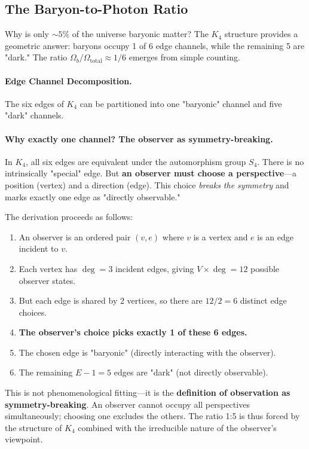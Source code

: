 \documentclass[11pt,a4paper]{book}
\begin{document}
\subsection{The Baryon-to-Photon Ratio}

Why is only $\sim 5\%$ of the universe baryonic matter? The $K_4$ structure provides a 
geometric answer: baryons occupy 1 of 6 edge channels, while the remaining 5 are "dark." 
The ratio $\Omega_b/\Omega_{\text{total}} \approx 1/6$ emerges from simple counting.

\paragraph{Edge Channel Decomposition.}
The six edges of $K_4$ can be partitioned into one "baryonic" channel and five "dark" 
channels. 

\paragraph{Why exactly one channel? The observer as symmetry-breaking.}

In $K_4$, all six edges are equivalent under the automorphism group $S_4$. There is no 
intrinsically "special" edge. But \textbf{an observer must choose a perspective}—a 
position (vertex) and a direction (edge). This choice \emph{breaks the symmetry} and 
marks exactly one edge as "directly observable."

The derivation proceeds as follows:
\begin{enumerate}
\item An observer is an ordered pair $(v, e)$ where $v$ is a vertex and $e$ is an edge 
      incident to $v$.
\item Each vertex has $\deg = 3$ incident edges, giving $V \times \deg = 12$ possible 
      observer states.
\item But each edge is shared by 2 vertices, so there are $12/2 = 6$ distinct edge choices.
\item \textbf{The observer's choice picks exactly 1 of these 6 edges.}
\item The chosen edge is "baryonic" (directly interacting with the observer).
\item The remaining $E - 1 = 5$ edges are "dark" (not directly observable).
\end{enumerate}

This is not phenomenological fitting—it is the \textbf{definition of observation as 
symmetry-breaking}. An observer cannot occupy all perspectives simultaneously; choosing 
one excludes the others. The ratio 1:5 is thus forced by the structure of $K_4$ combined 
with the irreducible nature of the observer's viewpoint.
\end{document}
